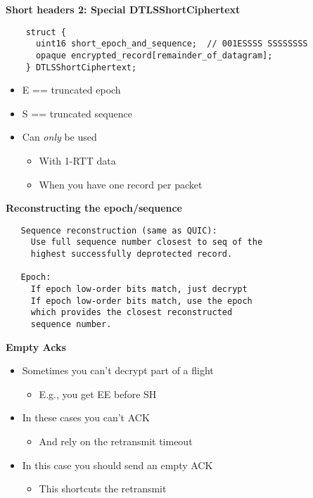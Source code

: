 \documentclass[helvetica]{seminar}
\newcommand{\heading}[1]{%
  \begin{center} 
    \large\bf 
    #1 
  \end{center} 
  \vspace{.4 in}}
\begin{document}
\begin{slide}
\heading{Short headers 2: Special DTLSShortCiphertext}

\begin{verbatim}
    struct {
      uint16 short_epoch_and_sequence;  // 001ESSSS SSSSSSSS
      opaque encrypted_record[remainder_of_datagram];
    } DTLSShortCiphertext;
\end{verbatim}

\begin{itemize}
\item E == truncated epoch
\item S == truncated sequence
\item Can \emph{only} be used
  \begin{itemize}
  \item With 1-RTT data
  \item When you have one record per packet
  \end{itemize}
\end{itemize}
\end{slide}


\begin{slide}
  \heading{Reconstructing the epoch/sequence}

\begin{verbatim}
   Sequence reconstruction (same as QUIC):
     Use full sequence number closest to seq of the
     highest successfully deprotected record.
 
   Epoch:
     If epoch low-order bits match, just decrypt
     If epoch low-order bits match, use the epoch
     which provides the closest reconstructed
     sequence number.
\end{verbatim}
\end{slide}


\begin{slide}
  \heading{Empty Acks}

  \begin{itemize}
  \item Sometimes you can't decrypt part of a flight
    \begin{itemize}
    \item E.g., you get EE before SH
    \end{itemize}
  \item In these cases you can't ACK
    \begin{itemize}
    \item And rely on the retransmit timeout
    \end{itemize}
  \item In this case you should send an empty ACK
    \begin{itemize}
    \item This shortcuts the retransmit
    \end{itemize}
  \end{itemize}
\end{slide}
\end{document}
